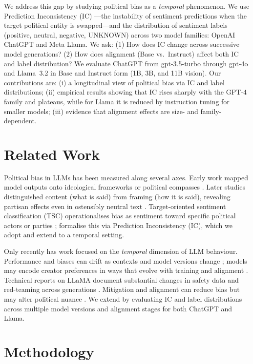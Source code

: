 \documentclass[11pt]{article}
\begin{document}
We address this gap by studying political bias as a \emph{temporal} phenomenon. We use Prediction Inconsistency (IC) \citep{elbouanani2025}---the instability of sentiment predictions when the target political entity is swapped---and the distribution of sentiment labels (positive, neutral, negative, UNKNOWN) across two model families: OpenAI ChatGPT and Meta Llama. We ask: (1) How does IC change across successive model generations? (2) How does alignment (Base vs.\ Instruct) affect both IC and label distribution? We evaluate ChatGPT from gpt-3.5-turbo through gpt-4o and Llama~3.2 in Base and Instruct form (1B, 3B, and 11B vision). Our contributions are: (i) a longitudinal view of political bias via IC and label distributions; (ii) empirical results showing that IC rises sharply with the GPT-4 family and plateaus, while for Llama it is reduced by instruction tuning for smaller models; (iii) evidence that alignment effects are size- and family-dependent.

\section{Related Work}

Political bias in LLMs has been measured along several axes. Early work mapped model outputs onto ideological frameworks or political compasses \citep{santurkar2023,hartmann2023}. Later studies distinguished content (what is said) from framing (how it is said), revealing partisan effects even in ostensibly neutral text \citep{bang2024}. Target-oriented sentiment classification (TSC) operationalises bias as sentiment toward specific political actors or parties \citep{wang2025,chen2024}; \citet{elbouanani2025} formalise this via Prediction Inconsistency (IC), which we adopt and extend to a temporal setting.

Only recently has work focused on the \emph{temporal} dimension of LLM behaviour. Performance and biases can drift as contexts and model versions change \citep{zhu2024}; models may encode creator preferences in ways that evolve with training and alignment \citep{buyl2026}. Technical reports on LLaMA document substantial changes in safety data and red-teaming across generations \citep{touvron2023,dubey2024}. Mitigation and alignment can reduce bias but may alter political nuance \citep{banko2025,bonaldi2024}. We extend \citet{elbouanani2025} by evaluating IC and label distributions across multiple model versions and alignment stages for both ChatGPT and Llama.

\section{Methodology}
\end{document}
